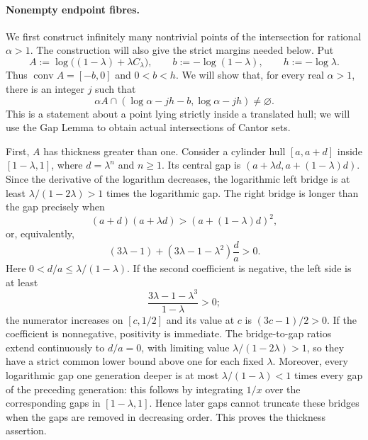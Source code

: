 \paragraph{Nonempty endpoint fibres.}
We first construct infinitely many nontrivial points of the intersection for
rational $\alpha>1$. The construction will also give the strict margins needed
below. Put
\[
 A:=\log\bigl((1-\lambda)+\lambda C_\lambda\bigr),
 \qquad b:=-\log(1-\lambda),\qquad h:=-\log\lambda.
\]
Thus $\operatorname{conv}A=[-b,0]$ and $0<b<h$.
We will show that, for every real $\alpha>1$, there is an integer $j$ such that
\begin{equation}\label{eq:coarse-strict-link}
 \alpha A\cap
 (\log\alpha-jh-b,\log\alpha-jh)\ne\varnothing.
\end{equation}
This is a statement about a point lying strictly inside a translated hull;
we will use the Gap Lemma to obtain actual intersections of Cantor sets.

First, $A$ has thickness greater than one. Consider a cylinder hull $[a,a+d]$
inside $[1-\lambda,1]$, where $d=\lambda^n$ and $n\ge1$.
Its central gap is $(a+\lambda d,a+(1-\lambda)d)$.
Since the derivative of the logarithm decreases, the logarithmic left bridge
is at least $\lambda/(1-2\lambda)>1$ times the logarithmic gap.
The right bridge is longer than the gap precisely when
\[
 (a+d)(a+\lambda d)>(a+(1-\lambda)d)^2,
\]
or, equivalently,
\[
 (3\lambda-1)+(3\lambda-1-\lambda^2)\frac da>0.
\]
Here $0<d/a\le\lambda/(1-\lambda)$. If the second coefficient is negative,
the left side is at least
\[
 \frac{3\lambda-1-\lambda^3}{1-\lambda}>0;
\]
the numerator increases on $[c,1/2]$ and its value at $c$ is $(3c-1)/2>0$.
If the coefficient is nonnegative, positivity is immediate.
The bridge-to-gap ratios extend continuously to $d/a=0$, with limiting
value $\lambda/(1-2\lambda)>1$, so they have a strict common lower bound
above one for each fixed $\lambda$.
Moreover, every logarithmic gap one generation deeper is at most
$\lambda/(1-\lambda)<1$ times every gap of the preceding generation:
this follows by integrating $1/x$ over the corresponding gaps in
$[1-\lambda,1]$. Hence later gaps cannot truncate these bridges when the
gaps are removed in decreasing order. This proves the thickness assertion.

